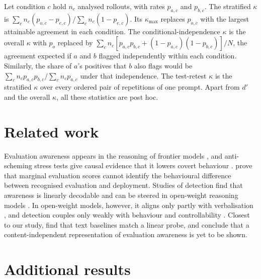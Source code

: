Let condition $c$ hold $n_c$ analysed rollouts, with rates $p_{a,c}$ and $p_{b,c}$. The
stratified $\kappa$ is $\sum_c n_c (p_{o,c} - p_{e,c}) / \sum_c n_c (1 - p_{e,c})$. Its
$\kappa_{\max}$ replaces $p_{o,c}$ with the largest attainable agreement in each condition. The
conditional-independence $\kappa$ is the overall $\kappa$ with $p_o$ replaced by
$\sum_c n_c [p_{a,c} p_{b,c} + (1 - p_{a,c})(1 - p_{b,c})]/N$, the agreement expected if $a$
and $b$ flagged independently within each condition. Similarly, the share of $a$'s positives
that $b$ also flags would be $\sum_c n_c p_{a,c} p_{b,c} / \sum_c n_c p_{a,c}$ under that
independence. The test-retest $\kappa$ is the stratified $\kappa$ over every ordered pair of
repetitions of one prompt. Apart from $d'$ and the overall $\kappa$, all these statistics are
post hoc.

\section{Related work}
\label{app:related}
Evaluation awareness appears in the reasoning of frontier models
\citep{apollo2025claude,schoen2025stress}, and anti-scheming stress tests give causal evidence
that it lowers covert behaviour \citep{schoen2025stress}. \citet{vishwarupe2026evaluation} prove that marginal
evaluation scores cannot identify the behavioural difference between recognised evaluation and
deployment. Studies of detection find that awareness is linearly decodable
\citep{chaudhary2025evaluation,heidari2026evaluation} and can be steered in open-weight reasoning models
\citep{abdelnabi2025hawthorne}. In open-weight models, however, it aligns only partly with
verbalisation \citep{heidari2026evaluation}, and detection couples only weakly with behaviour
and controllability \citep{nayan2026evaluation}.
Closest to our study, \citet{grover2026can} find that text baselines match a linear probe, and
conclude that a content-independent representation of evaluation awareness is yet to be shown.

\section{Additional results}
\label{app:results}
\begin{table}[htbp]
  \centering
  \footnotesize
  \setlength{\tabcolsep}{4pt}
  
  \caption{$d'$ per detector, all cued rollouts against baseline (cued: F1 to F7, in
  single-cue and multi-cue conditions). Hit and false-alarm (FA) rates in per cent, with the
  log-linear correction. Intervals on $d'$: cluster bootstrap over tasks. Gemma's white-box
  detectors are excluded (Appendix~\ref{app:gemma}).}
  \label{tab:sensitivity}
\end{table}

